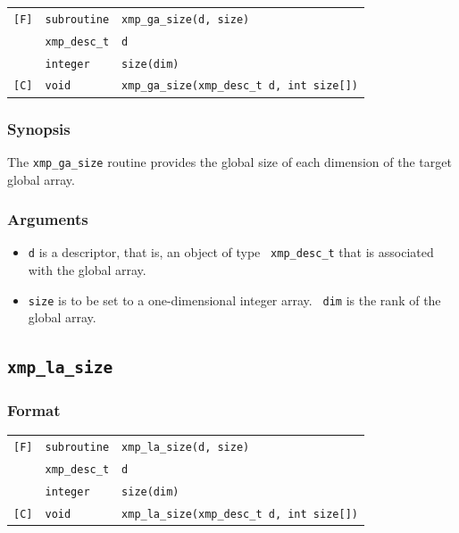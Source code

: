 \begin{tabular}{lll}

\verb![F]!& {\tt subroutine}& {\tt xmp\_ga\_size(d, size)}\\
          & {\tt xmp\_desc\_t} & {\tt d}\\
          & {\tt integer} & {\tt size(dim)}\\

\verb![C]!&  {\tt void}& {\tt xmp\_ga\_size(xmp\_desc\_t d, int size[])}\\

\end{tabular}

\subsubsection*{Synopsis}

The {\tt xmp\_ga\_size} routine provides the global size of each
dimension of the target global array.

\subsubsection*{Arguments}

\begin{itemize}
 \item {\tt d} is a descriptor, that is, an object of type {\tt
       xmp\_desc\_t} that is associated with the global array.
 \item {\tt size} is to be set to a one-dimensional integer array. {\tt
       dim} is the rank of the global array.
\end{itemize}

\subsection{\tt xmp\_la\_size}

\subsubsection*{Format}

\begin{tabular}{lll}

\verb![F]!& {\tt subroutine}& {\tt xmp\_la\_size(d, size)}\\
          & {\tt xmp\_desc\_t} & {\tt d}\\
          & {\tt integer} & {\tt size(dim)}\\

\verb![C]!&  {\tt void}& {\tt xmp\_la\_size(xmp\_desc\_t d, int size[])}\\

\end{tabular}

